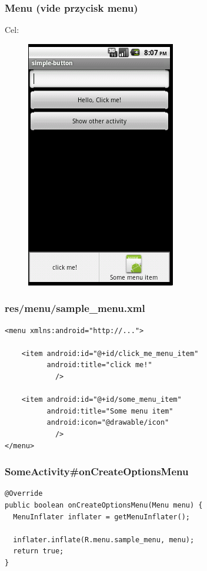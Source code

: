 \begin{frame}\frametitle{Menu (vide przycisk menu)}
\begin{center}
 Cel:\\
 \begin{figure}
  \includegraphics[height=.75\textheight]{images/sample_with_menu}
 \end{figure}
\end{center}
\end{frame}

\begin{frame}[fragile]\frametitle{res/menu/sample\_menu.xml}
\begin{lstlisting}
<menu xmlns:android="http://...">

    <item android:id="@+id/click_me_menu_item"
          android:title="click me!"
            />

    <item android:id="@+id/some_menu_item"
          android:title="Some menu item"
          android:icon="@drawable/icon"
            />
</menu>
\end{lstlisting}
\end{frame}

\begin{frame}[fragile]\frametitle{SomeActivity\#onCreateOptionsMenu}
\begin{lstlisting}
@Override
public boolean onCreateOptionsMenu(Menu menu) { 
  MenuInflater inflater = getMenuInflater();

  inflater.inflate(R.menu.sample_menu, menu);
  return true;
}
\end{lstlisting}
\end{frame}

